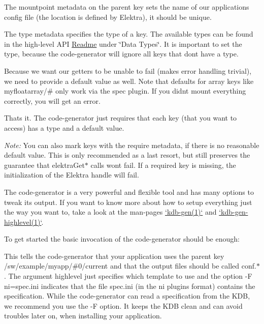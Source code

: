 The {\ttfamily mountpoint} metadata on the parent key sets the name of our application\textquotesingle{}s config file (the location is defined by Elektra), it should be unique.

The {\ttfamily type} metadata specifies the type of a key. The available types can be found in the high-\/level A\+PI \hyperlink{src_libs_highlevel_README_md}{Readme} under \char`\"{}\+Data Types\char`\"{}. It is important to set the {\ttfamily type}, because the code-\/generator will ignore all keys that don\textquotesingle{}t have a {\ttfamily type}.

Because we want our getters to be unable to fail (makes error handling trivial), we need to provide a {\ttfamily default} value as well. Note that {\ttfamily default}s for array keys like {\ttfamily myfloatarray/\#} only work via the {\ttfamily spec} plugin. If you didn\textquotesingle{}t mount everything correctly, you will get an error.

That\textquotesingle{}s it. The code-\/generator just requires that each key (that you want to access) has a {\ttfamily type} and a {\ttfamily default} value.

{\itshape Note\+:} You can also mark keys with the {\ttfamily require} metadata, if there is no reasonable default value. This is only recommended as a last resort, but still preserves the guarantee that {\ttfamily elektra\+Get$\ast$} calls won\textquotesingle{}t fail. If a {\ttfamily require}d key is missing, the initialization of the {\ttfamily Elektra} handle will fail.

The code-\/generator is a very powerful and flexible tool and has many options to tweak its output. If you want to know more about how to setup everything just the way you want to, take a look at the man-\/pages \hyperlink{doc_help_kdb-gen_md}{`kdb-\/gen(1)`} and \hyperlink{doc_help_kdb-gen-highlevel_md}{`kdb-\/gen-\/highlevel(1)`}.

To get started the basic invocation of the code-\/generator should be enough\+:




This tells the code-\/generator that your application uses the parent key {\ttfamily /sw/example/myapp/\#0/current} and that the output files should be called {\ttfamily conf.$\ast$}. The argument {\ttfamily highlevel} just specifies which template to use and the option {\ttfamily -\/F ni=spec.\+ini} indicates that the file {\ttfamily spec.\+ini} (in the {\ttfamily ni} plugin\textquotesingle{}s format) contains the specification. While the code-\/generator can read a specification from the K\+DB, we recommend you use the {\ttfamily -\/F} option. It keeps the K\+DB clean and can avoid troubles later on, when installing your application.


